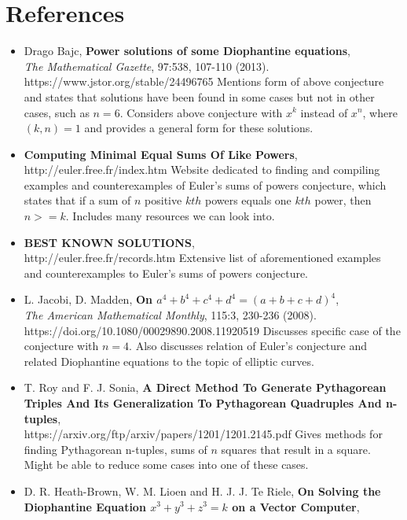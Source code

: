 \documentclass[psamsfonts]{amsart}
\theoremstyle{definition}
\theoremstyle{remark}
\numberwithin{equation}{section}
\begin{document}


\section{References}
\begin{itemize}
    \item Drago Bajc, {\bf Power solutions of some Diophantine equations}, \\
        \textit{The Mathematical Gazette}, 97:538, 107-110 (2013). \\
        https://www.jstor.org/stable/24496765
        \subitem Mentions form of above conjecture and states that solutions have been found in some cases but not in other cases, such as $n=6$. Considers above conjecture with $x^k$ instead of $x^n$, where $(k,n)=1$ and provides a general form for these solutions. 
    \item {\bf Computing Minimal Equal Sums Of Like Powers}, \\
        http://euler.free.fr/index.htm 
        \subitem Website dedicated to finding and compiling examples and counterexamples of Euler's sums of powers conjecture, which states that if a sum of $n$ positive $kth$ powers equals one $kth$ power, then $n>=k$. Includes many resources we can look into. 
    \item {\bf BEST KNOWN SOLUTIONS}, \\
        http://euler.free.fr/records.htm
        \subitem  Extensive list of aforementioned examples and counterexamples to Euler's sums of powers conjecture.
    \item L. Jacobi, D. Madden, {\bf On $a^4 + b^4 + c^4 + d^4=(a+b+c+d)^4$}, \\
        \textit{The American Mathematical Monthly}, 115:3, 230-236 (2008). \\
        https://doi.org/10.1080/00029890.2008.11920519
        \subitem Discusses specific case of the conjecture with $n=4$. Also discusses relation of Euler's conjecture and related Diophantine equations to the topic of elliptic curves. 
    \item T. Roy and F. J. Sonia, {\bf A Direct Method To Generate Pythagorean Triples And Its Generalization To Pythagorean Quadruples And n-tuples},\\ 
    https://arxiv.org/ftp/arxiv/papers/1201/1201.2145.pdf 
        \subitem Gives methods for finding Pythagorean n-tuples, sums of $n$ squares that result in a square. Might be able to reduce some cases into one of these cases. 
    \item D. R. Heath-Brown, W. M. Lioen and H. J. J. Te Riele, {\bf On Solving the Diophantine Equation $x^3 + y^3 + z^3 = k$ on a Vector Computer},\\

\end{itemize}
\end{document}

